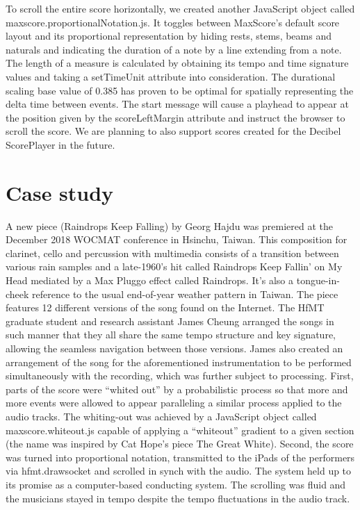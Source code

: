 To scroll the entire score horizontally, we created another JavaScript object called maxscore.proportionalNotation.js. It toggles between MaxScore’s default score layout and its proportional representation by hiding rests, stems, beams and naturals and indicating the duration of a note by a line extending from a note. The length of a measure is calculated by obtaining its tempo and time signature values and taking a setTimeUnit attribute into consideration. The durational scaling base value of 0.385 has proven to be optimal for spatially representing the delta time between events. The start message will cause a playhead to appear at the position given by the scoreLeftMargin attribute and instruct the browser to scroll the score. We are planning to also support scores created for the Decibel ScorePlayer in the future. 







\section{Case study}

A new  piece (Raindrops Keep Falling) by Georg Hajdu was premiered at the December 2018 WOCMAT conference in Hsinchu, Taiwan. This composition for clarinet, cello and percussion with multimedia consists of a transition between various rain samples and a late-1960’s hit called Raindrops Keep Fallin' on My Head mediated by a Max Pluggo effect called Raindrops. It’s also a tongue-in-cheek reference to the usual end-of-year weather pattern in Taiwan. The piece features 12 different versions of the song found on the Internet. The HfMT graduate student and research assistant James Cheung arranged the songs in such manner that they all share the same tempo structure and key signature, allowing the seamless navigation between those versions. James also created an arrangement of the song for the aforementioned instrumentation to be performed simultaneously with the recording, which was further subject to processing. First, parts of the score were “whited out” by a probabilistic process so that more and more events were allowed to appear paralleling a similar process applied to the audio tracks. The whiting-out was achieved by a JavaScript object called maxscore.whiteout.js capable of applying a “whiteout” gradient to a given section (the name was inspired by Cat Hope’s piece The Great White). Second, the score was turned into proportional notation, transmitted to the iPads of the performers via hfmt.drawsocket and scrolled in synch with the audio. The system held up to its promise as a computer-based conducting system. The scrolling was fluid and the musicians stayed in tempo despite the tempo fluctuations in the audio track. 

